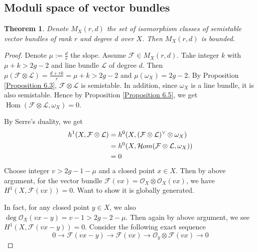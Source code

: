 \documentclass{ctexart}
\newtheorem{theorem}{Theorem}[section]
\renewcommand{\hom}{\operatorname{Hom}}
\newcommand{\sheafhom}{\mathcal{H}\kern -.5pt om}
\begin{document}
\subsection{Moduli space of vector bundles}
\label{subsection:Moduli_Space_of_Vector_Bundles_Moduli_space_of_vector_bundles}

\begin{theorem}
    Denote $M_{X}(r, d)$ the set of isomorphism classes of semistable vector bundles of rank $r$ and degree $d$ over $X$.
    Then $M_{X}(r, d)$ is bounded.
    \label{Theorem 7.6}
\end{theorem}
\begin{proof}
    Denote $\mu := \frac{d}{r}$ the slope.
    Assume $\mathcal{F}\in M_{X}(r, d)$.
    Take integer $k$ with $\mu + k > 2g - 2$ and line bundle $\mathcal{L}$ of degree $d$.
    Then $\mu(\mathcal{F} \otimes \mathcal{L}) = \frac{d + rk}{r} = \mu + k > 2g - 2$ and $\mu(\omega_{X}) = 2g - 2$.
    By Proposition \ref{Proposition 6.3}, $\mathcal{F} \otimes \mathcal{L}$ is semistable.
    In addition, since $\omega_{X}$ is a line bundle, it is also semistable.
    Hence by Proposition \ref{Proposition 6.5}, we get $\hom(\mathcal{F} \otimes \mathcal{L}, \omega_{X}) = 0$.
    \par
    By Serre's duality, we get
    \begin{equation}
        \begin{split}
            h^{1}(X, \mathcal{F} \otimes \mathcal{L}) & = h^{0}(X, (\mathcal{F} \otimes \mathcal{L})^{\vee} \otimes \omega_{X}) \\
            & = h^{0}(X, \sheafhom(\mathcal{F} \otimes \mathcal{L}, \omega_{X})) \\
            & = 0
        \end{split}
    \end{equation}
    Choose integer $v > 2g - 1 - \mu$ and a closed point $x\in X$.
    Then by above argument, for the vector bundle $\mathcal{F}(vx) = \mathcal{O}_{X} \otimes \mathcal{O}_{X}(vx)$, we have $H^{1}(X, \mathcal{F}(vx)) = 0$.
    Want to show it is globally generated.
    \par
    In fact, for any closed point $y\in X$, we also $\deg \mathcal{O}_{X}(vx - y) = v - 1 > 2g - 2 - \mu$.
    Then again by above argument, we see $H^{1}(X, \mathcal{F}(vx - y)) = 0$.
    Consider the following exact sequence
    \begin{equation}
        0 \longrightarrow \mathcal{F}(vx - y) \longrightarrow \mathcal{F}(vx) \longrightarrow \mathcal{O}_{y} \otimes \mathcal{F}(vx) \longrightarrow 0

\end{equation}
\end{proof}
\end{document}
